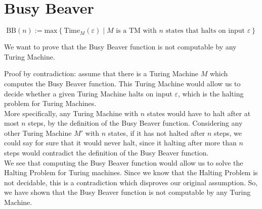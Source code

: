 

\setcounter{section}{3}


\section{Busy Beaver}

$$\text{BB}(n) := \text{max}\left\{\text{Time}_{M}(\varepsilon)\mid M\text{ is a TM with }n\text{ states that halts on input }\varepsilon\right\}$$

We want to prove that the Busy Beaver function is not computable by any Turing Machine.

Proof by contradiction: assume that there is a Turing Machine $M$ which computes the Busy Beaver function. This Turing Machine would allow us to decide whether a given Turing Machine halts on input $\varepsilon$, which is the halting problem for Turing Machines.\\
More specifically, any Turing Machine with $n$ states would have to halt after at most $n$ steps, by the definition of the Busy Beaver function. Considering any other Turing Machine $M'$ with $n$ states, if it has not halted after $n$ steps, we could say for sure that it would never halt, since it halting after more than $n$ steps would contradict the definition of the Busy Beaver function.\\
We see that computing the Busy Beaver function would allow us to solve the Halting Problem for Turing machines. Since we know that the Halting Problem is not decidable, this is a contradiction which disproves our original assumption. So, we have shown that the Busy Beaver function is not computable by any Turing Machine.


